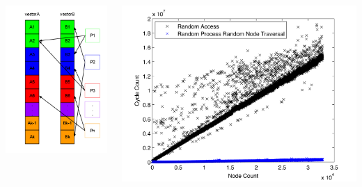 \documentclass[final]{beamer}
\begin{document}
\begin{frame}[t]
\begin{columns}[t]
\begin{column}{0.60\paperwidth}
\begin{columns}[t,totalwidth=0.60\paperwidth]
\begin{column}{0.10\paperwidth}
\begin{columns}[t,totalwidth=0.10\paperwidth]
							\begin{column}{0.10\paperwidth}
								\includegraphics[width=0.09\paperwidth]{img/rand_access}
							\end{column}
						\end{columns}
					\end{column}
					\begin{column}{0.24\paperwidth}
						\begin{columns}[t,totalwidth=0.22\paperwidth]
							\begin{column}{0.24\paperwidth}
								\includegraphics[width=0.26\paperwidth]{img/data/random_access}

\end{column}
\end{columns}
\end{column}
\end{columns}
\end{column}
\end{columns}
\end{frame}
\end{document}
